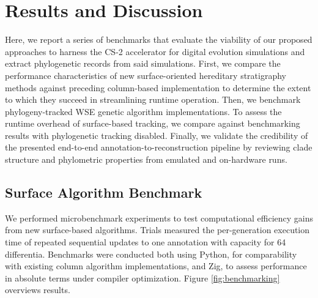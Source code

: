 \section{Results and Discussion} \label{sec:results}

Here, we report a series of benchmarks that evaluate the viability of our proposed approaches to harness the CS-2 accelerator for digital evolution simulations and extract phylogenetic records from said simulations.
First, we compare the performance characteristics of new surface-oriented hereditary stratigraphy methods against preceding column-based implementation to determine the extent to which they succeed in streamlining runtime operation.
Then, we benchmark phylogeny-tracked WSE genetic algorithm implementations.
To assess the runtime overhead of surface-based tracking, we compare against benchmarking results with phylogenetic tracking disabled.
Finally, we validate the credibility of the presented end-to-end annotation-to-reconstruction pipeline by reviewing clade structure and phylometric properties from emulated and on-hardware runs.

\subsection{Surface Algorithm Benchmark}



We performed microbenchmark experiments to test computational efficiency gains from new surface-based algorithms.
Trials measured the per-generation execution time of repeated sequential updates to one annotation with capacity for 64 differentia. %
Benchmarks were conducted both using Python, for comparability with existing column algorithm implementations, and Zig, to assess performance in absolute terms under compiler optimization.
Figure \ref{fig:benchmarking} overviews results.


